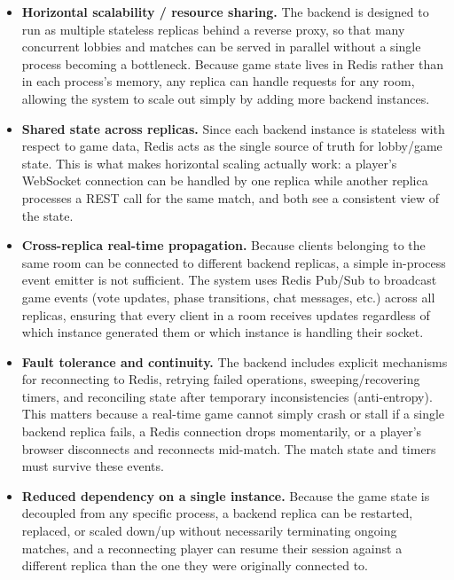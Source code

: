 \documentclass{scrartcl}
\begin{document}
\begin{itemize}
    \item \textbf{Horizontal scalability / resource sharing.} The backend is designed to run as multiple stateless replicas behind a reverse proxy, so that many concurrent lobbies and matches can be served in parallel without a single process becoming a bottleneck. Because game state lives in Redis rather than in each process's memory, any replica can handle requests for any room, allowing the system to scale out simply by adding more backend instances.

    \item \textbf{Shared state across replicas.} Since each backend instance is stateless with respect to game data, Redis acts as the single source of truth for lobby/game state. This is what makes horizontal scaling actually work: a player's WebSocket connection can be handled by one replica while another replica processes a REST call for the same match, and both see a consistent view of the state.

    \item \textbf{Cross-replica real-time propagation.} Because clients belonging to the same room can be connected to different backend replicas, a simple in-process event emitter is not sufficient. The system uses Redis Pub/Sub to broadcast game events (vote updates, phase transitions, chat messages, etc.) across all replicas, ensuring that every client in a room receives updates regardless of which instance generated them or which instance is handling their socket.

    \item \textbf{Fault tolerance and continuity.} The backend includes explicit mechanisms for reconnecting to Redis, retrying failed operations, sweeping/recovering timers, and reconciling state after temporary inconsistencies (anti-entropy). This matters because a real-time game cannot simply crash or stall if a single backend replica fails, a Redis connection drops momentarily, or a player's browser disconnects and reconnects mid-match. The match state and timers must survive these events.

    \item \textbf{Reduced dependency on a single instance.} Because the game state is decoupled from any specific process, a backend replica can be restarted, replaced, or scaled down/up without necessarily terminating ongoing matches, and a reconnecting player can resume their session against a different replica than the one they were originally connected to.
\end{itemize}
\end{document}
